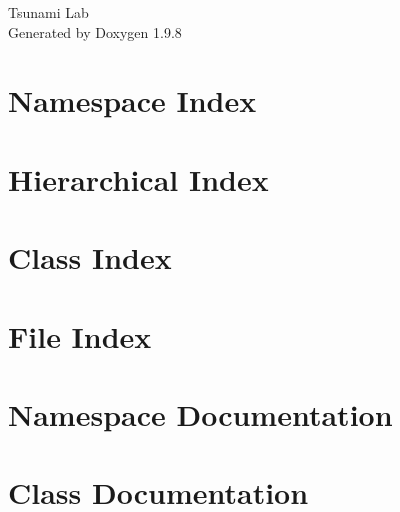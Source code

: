 \documentclass[twoside]{book}
\newcommand{\+}{\discretionary{\mbox{\scriptsize$\hookleftarrow$}}{}{}}
\newcommand{\clearemptydoublepage}{%
    \newpage{\pagestyle{empty}\cleardoublepage}%
  }
\begin{document}
  \raggedbottom
    \hypersetup{pageanchor=false,
                bookmarksnumbered=true,
                pdfencoding=unicode
               }
  \begin{titlepage}
  \vspace*{7cm}
  \begin{center}%
  {\Large Tsunami Lab}\\
  \vspace*{1cm}
  {\large Generated by Doxygen 1.9.8}\\
  \end{center}
  \end{titlepage}
  \clearemptydoublepage
  \tableofcontents
  \clearemptydoublepage
  \hypersetup{pageanchor=true}
\chapter{Namespace Index}

\chapter{Hierarchical Index}

\chapter{Class Index}

\chapter{File Index}

\chapter{Namespace Documentation}

\chapter{Class Documentation}










\end{document}
